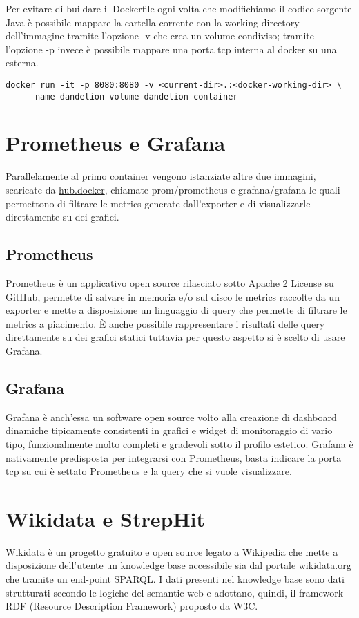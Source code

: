 Per evitare di buildare il Dockerfile ogni volta che modifichiamo il codice sorgente Java è possibile mappare la cartella corrente con la working directory dell'immagine tramite l'opzione -v che crea un volume condiviso;
tramite l'opzione -p invece è possibile mappare una porta tcp interna al docker su una esterna.

\begin{lstlisting}[style=YmlStyle]
    docker run -it -p 8080:8080 -v <current-dir>.:<docker-working-dir> \
    --name dandelion-volume dandelion-container
\end{lstlisting}

\section{Prometheus e Grafana}
Parallelamente al primo container vengono istanziate altre due immagini, scaricate da \href{https://hub.docker.com/}{hub.docker}, chiamate prom/prometheus e grafana/grafana le quali permettono di filtrare le metrics 
generate dall'exporter e di visualizzarle direttamente su dei grafici. 

\subsection{Prometheus}
\href{https://prometheus.io/}{Prometheus} è un applicativo open source rilasciato sotto Apache 2 License su GitHub, permette di salvare in memoria e/o sul disco le metrics raccolte da un exporter e mette a disposizione 
un linguaggio di query che permette di filtrare le metrics a piacimento. È anche possibile rappresentare i risultati delle query direttamente su dei grafici statici tuttavia per questo aspetto si è scelto di usare Grafana.

\subsection{Grafana}
\href{https://grafana.com/}{Grafana} è anch'essa un software open source volto alla creazione di dashboard dinamiche tipicamente consistenti in grafici e widget di monitoraggio di vario tipo, funzionalmente molto completi 
e gradevoli sotto il profilo estetico. Grafana è nativamente predisposta per integrarsi con Prometheus, basta indicare la porta tcp su cui è settato Prometheus e la query che si vuole visualizzare.   

\section{Wikidata e StrepHit}
Wikidata è un progetto gratuito e open source legato a Wikipedia che mette a disposizione dell'utente un knowledge base accessibile sia dal portale wikidata.org che tramite un end-point SPARQL.
I dati presenti nel knowledge base sono dati strutturati secondo le logiche del semantic web e adottano, quindi, il framework RDF (Resource Description Framework) proposto da W3C. 

